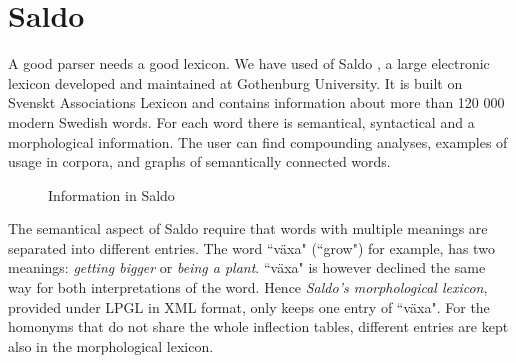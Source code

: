 \documentclass{report}
\begin{document}
\section{Saldo}
\label{sec:saldo}
A good parser needs a good lexicon. We have used of Saldo \cite{saldo}, a
large electronic lexicon developed and maintained at Gothenburg University. It is
built on Svenskt Associations Lexicon and contains information about more than 
120 000 modern Swedish words.
For each word there is semantical, syntactical and a morphological
information. The user can find compounding analyses, examples of usage in corpora,
and graphs of semantically connected words.\\
\begin{figure}[h!]
\centering
{}
\hspace{20mm}
\caption{Information in Saldo}
\label{fig:saldo}
\end{figure}

The semantical aspect of Saldo require that words with multiple meanings are
separated into different entries.
The word ``växa" (``grow") for example, has two meanings: \emph{getting
bigger}
or \emph{being a plant}. 
``växa" is however declined the same way for both interpretations of the word.
Hence \textit{Saldo's morphological lexicon}, provided under LPGL in XML format,
only keeps one entry of ``växa".
For the homonyms that do not share the whole inflection tables, different entries are 
kept also in the morphological lexicon.
\end{document}

